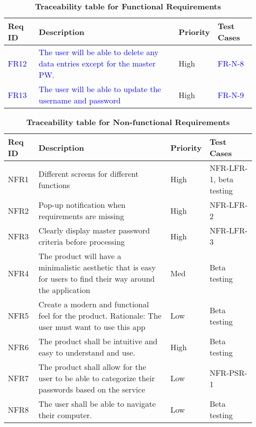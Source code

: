 \documentclass[12pt, titlepage]{article}
\begin{document}
\begin{table}[!htbp]
    \caption{\textbf{Traceability table for Functional Requirements}} \label{5Table}
    \begin{tabularx}{\textwidth}{p{2cm}Xp{2cm}X}
        \toprule
        \textbf{Req ID} & \textbf{Description} & \textbf{Priority} & \textbf{Test Cases}\\
        \midrule
        \textcolor{blue}{FR12}  & \textcolor{blue}{The user will be able to delete any data entries except for the master PW.} & High & \textcolor{blue}{FR-N-8}\\\hline
        \textcolor{blue}{FR13} & \textcolor{blue}{The user will be able to update the username and password} & High & \textcolor{blue}{FR-N-9}\\
    
        \bottomrule
    \end{tabularx}
\end{table}

\begin{table}[!htbp]
    \caption{\textbf{Traceability table for Non-functional Requirements}} \label{6Table}
    \small
    \begin{tabularx}{\textwidth}{p{2cm}Xp{2cm}X}
        \toprule
        \textbf{Req ID} & \textbf{Description} & \textbf{Priority} & \textbf{Test Cases}\\
        \midrule
        
        NFR1  & Different screens for different functions & High & NFR-LFR-1, beta testing\\\hline
        NFR2  & Pop-up notification when requirements are missing & High & NFR-LFR-2\\\hline
        NFR3  & Clearly display master password criteria before processing & High & NFR-LFR-3\\\hline      
        NFR4  & The product will have a minimalistic aesthetic that is easy for users to find their way around the application & Med & Beta testing\\\hline
        NFR5  & Create a modern and functional feel for the product. Rationale: The user must want to use this app & Low & Beta testing\\\hline
        NFR6  & The product shall be intuitive and easy to understand and use. & High & Beta testing\\\hline
        NFR7  & The product shall allow for the user to be able to categorize their passwords based on the service & Low & NFR-PSR-1\\\hline
        NFR8  & The user shall be able to navigate their computer. & Low & Beta testing\\
        
        \midrule 
    \end{tabularx}
\end{table}
\end{document}
